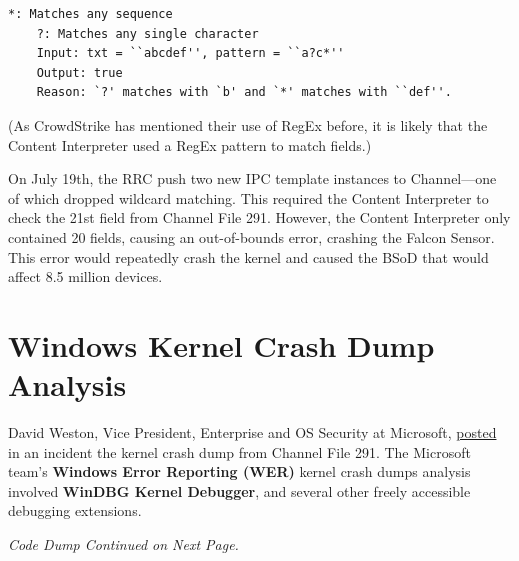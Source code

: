 \begin{lstlisting}[caption=Wildcard Pattern Matching Example]
    *: Matches any sequence 
    ?: Matches any single character
    Input: txt = ``abcdef'', pattern = ``a?c*''
    Output: true
    Reason: `?' matches with `b' and `*' matches with ``def''.
\end{lstlisting}
    
\noindent
(As CrowdStrike has mentioned their use of RegEx before, it is likely that the Content Interpreter used a RegEx pattern to match fields.)

On July 19th, the RRC push two new IPC template instances to Channel---one of which dropped wildcard matching. This required the Content Interpreter to check the 21st field from Channel File 291. However, the Content Interpreter only contained 20 fields, causing an out-of-bounds error, crashing the Falcon Sensor. This error would repeatedly crash the kernel and caused the BSoD that would affect 8.5 million devices.

\section{Windows Kernel Crash Dump Analysis}

David Weston, Vice President, Enterprise and OS Security at Microsoft, \href{https://www.microsoft.com/en-us/security/blog/2024/07/27/windows-security-best-practices-for-integrating-and-managing-security-tools/}{posted} in an incident
the kernel crash dump from Channel File 291. \cite{weston_windows_security_2024} The Microsoft team's \textbf{Windows Error Reporting (WER)}
kernel crash dumps analysis involved \textbf{WinDBG Kernel Debugger}, and several other freely accessible debugging extensions. 

\vfill
\begin{center}
\textit{Code Dump Continued on Next Page.}
\end{center}
\vfill

\newpage


